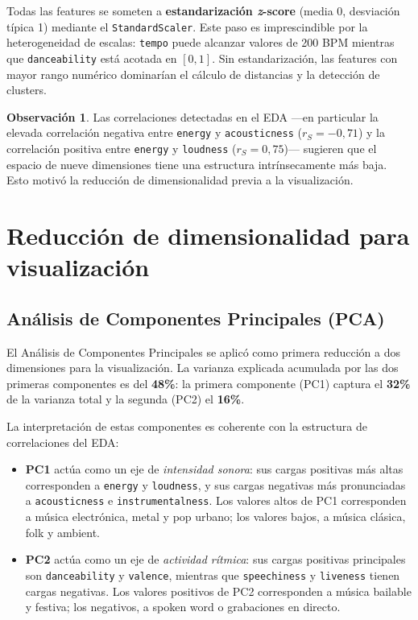 \documentclass[12pt, a4paper]{book}
\theoremstyle{definition}
\newtheorem{observacion}{Observación}[chapter]
\begin{document}
Todas las features se someten a \textbf{estandarización \textit{z}-score}
(media 0, desviación típica 1) mediante el \texttt{StandardScaler}. Este paso
es imprescindible por la heterogeneidad de escalas: \texttt{tempo} puede
alcanzar valores de 200 BPM mientras que \texttt{danceability} está acotada
en $[0,1]$. Sin estandarización, las features con mayor rango numérico
dominarían el cálculo de distancias y la detección de clusters.

\begin{observacion}
Las correlaciones detectadas en el EDA ---en particular la elevada correlación
negativa entre \texttt{energy} y \texttt{acousticness} ($r_S = -0{,}71$) y la
correlación positiva entre \texttt{energy} y \texttt{loudness} ($r_S = 0{,}75$)---
sugieren que el espacio de nueve dimensiones tiene una estructura
intrínsecamente más baja. Esto motivó la reducción de dimensionalidad previa
a la visualización.
\end{observacion}

\section{Reducción de dimensionalidad para visualización}
\label{sec:reduccion}

\subsection{Análisis de Componentes Principales (PCA)}

El Análisis de Componentes Principales se aplicó como primera reducción a
dos dimensiones para la visualización. La varianza explicada acumulada por
las dos primeras componentes es del \textbf{48\%}: la primera componente
(PC1) captura el \textbf{32\%} de la varianza total y la segunda (PC2) el
\textbf{16\%}.

La interpretación de estas componentes es coherente con la estructura de
correlaciones del EDA:
\begin{itemize}
  \item \textbf{PC1} actúa como un eje de \textit{intensidad sonora}: sus
        cargas positivas más altas corresponden a \texttt{energy} y
        \texttt{loudness}, y sus cargas negativas más pronunciadas a
        \texttt{acousticness} e \texttt{instrumentalness}. Los valores altos
        de PC1 corresponden a música electrónica, metal y pop urbano; los
        valores bajos, a música clásica, folk y ambient.
  \item \textbf{PC2} actúa como un eje de \textit{actividad rítmica}:
        sus cargas positivas principales son \texttt{danceability} y
        \texttt{valence}, mientras que \texttt{speechiness} y
        \texttt{liveness} tienen cargas negativas. Los valores positivos
        de PC2 corresponden a música bailable y festiva; los negativos, a
        spoken word o grabaciones en directo.
\end{itemize}
\end{document}
